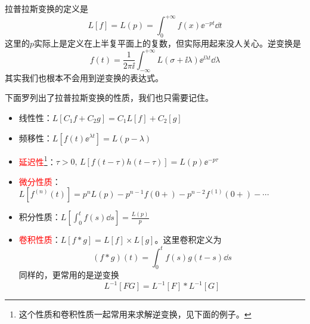 拉普拉斯变换的定义是
\[L\left[f\right] = L\left(p\right) = \int_{0}^{+\infty} f\left(x\right) \ee^{-p t} \dd{t}\]
这里的$p$实际上是定义在上半复平面上的复数，但实际用起来没人关心。逆变换是
\[f\left(t\right) = \frac{1}{2 \pi \ii} \int_{-\infty}^{+\infty} L\left(\sigma + \ii \lambda\right) \ee^{\ii \lambda t} \dd{\lambda}\]
其实我们也根本不会用到逆变换的表达式。

下面罗列出了拉普拉斯变换的性质，我们也只需要记住。
\begin{itemize}
    \item 线性性：$L\left[C_1 f + C_2 g\right] = C_1 L\left[f\right] + C_2 \left[g\right]$
    \item 频移性：$L\left[f\left(t\right) \ee^{\lambda t}\right] = L\left(p - \lambda\right)$
    \item \textcolor{red}{延迟性}\footnote{这个性质和卷积性质一起常用来求解逆变换，见下面的例子。}：$\tau > 0,\, L\left[f\left(t - \tau\right) h\left(t - \tau\right)\right] = L\left(p\right) \ee^{- p \tau}$
    \item \textcolor{red}{微分性质}：$L\left[f^{\left(n\right)}\left(t\right)\right] = p^n L\left(p\right) - p^{n-1} f\left(0+\right) - p^{n-2} f^{\left(1\right)}\left(0+\right) - \cdots$
    \item 积分性质：$L\left[\int_{0}^{t} f\left(s\right) \dd{s}\right] = \frac{L\left(p\right)}{p}$
    \item \textcolor{red}{卷积性质}：$L\left[f * g\right] = L\left[f\right] \times L\left[g\right]$。这里卷积定义为
        \[\left(f * g\right)\left(t\right) = \int_{0}^{t} f\left(s\right) g\left(t-s\right) \dd{s}\]
        同样的，更常用的是逆变换
        \[L^{-1}\left[F G\right] = L^{-1}\left[F\right] * L^{-1}\left[G\right]\]
\end{itemize}

